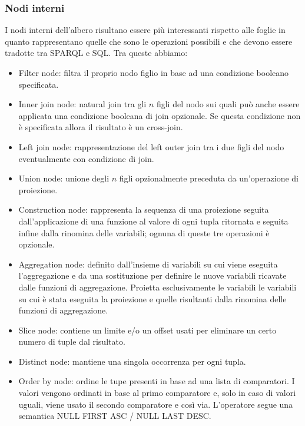 \subsubsection*{Nodi interni} 
I nodi interni dell'albero risultano essere più interessanti rispetto alle foglie in quanto rappresentano quelle che sono le operazioni possibili e che devono essere tradotte tra SPARQL e SQL. Tra queste abbiamo:
    \begin{itemize}
        \item Filter node: filtra il proprio nodo figlio in base ad una condizione booleano specificata.
        \item Inner join node: natural join tra gli $n$ figli del nodo sui quali può anche essere applicata una condizione booleana di join opzionale. Se questa condizione non è specificata allora il risultato è un cross-join.
        \item Left join node: rappresentazione del left outer join tra i due figli del nodo eventualmente con condizione di join.
        \item Union node: unione degli $n$ figli opzionalmente preceduta da un'operazione di proiezione.
        \item Construction node: rappresenta la sequenza di una proiezione seguita dall'applicazione di una funzione al valore di ogni tupla ritornata e seguita infine dalla rinomina delle variabili;
            ognuna di queste tre operazioni è opzionale.
        \item Aggregation node: definito dall'insieme di variabili su cui viene eseguita l'aggregazione e da una sostituzione per definire le nuove variabili ricavate dalle funzioni di aggregazione. Proietta esclusivamente le variabili
            le variabili su cui è stata eseguita la proiezione e quelle risultanti dalla rinomina delle funzioni di aggregazione.
        \item Slice node: contiene un limite e/o un offset usati per eliminare un certo numero di tuple dal risultato.
        \item Distinct node: mantiene una singola occorrenza per ogni tupla.
        \item Order by node: ordine le tupe presenti in base ad una lista di comparatori. I valori vengono ordinati in base al primo comparatore e, solo in caso di valori uguali, viene usato il secondo comparatore e così via.
            L'operatore segue una semantica NULL FIRST ASC / NULL LAST DESC. 
    \end{itemize}


